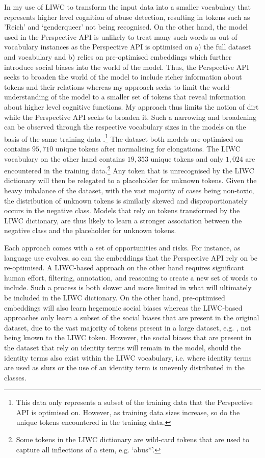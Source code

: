 In my use of LIWC to transform the input data into a smaller vocabulary that represents higher level cognition of abuse detection, resulting in tokens such as 'Reich' and `genderqueer' not being recognised.
On the other hand, the model used in the Perspective API is unlikely to treat many such words as out-of-vocabulary instances as the Perspective API is optimised on a) the full dataset and vocabulary and b) relies on pre-optimised embeddings which further introduce social biases into the world of the model.
Thus, the Perspective API seeks to broaden the world of the model to include richer information about tokens and their relations whereas my approach seeks to limit the world-understanding of the model to a smaller set of tokens that reveal information about higher level cognitive functions.
My approach thus limits the notion of dirt while the Perspective API seeks to broaden it.
Such a narrowing and broadening can be observed through the respective vocabulary sizes in the models on the basis of the same training data \citep{Wulczyn:2017}.\footnote{This data only represents a subset of the training data that the Perspective API is optimised on. However, as training data sizes increase, so do the unique tokens encountered in the training data.}
The dataset both models are optimised on contains $95,710$ unique tokens after normalising for elongations.
The LIWC vocabulary on the other hand contains $19,353$ unique tokens and only $1,024$ are encountered in the training data.\footnote{Some tokens in the LIWC dictionary are wild-card tokens that are used to capture all inflections of a stem, e.g. `abus*'.}
Any token that is unrecognised by the LIWC dictionary will then be relegated to a placeholder for unknown tokens.
Given the heavy imbalance of the dataset, with the vast majority of cases being non-toxic, the distribution of unknown tokens is similarly skewed and disproportionately occurs in the negative class.
Models that rely on tokens transformed by the LIWC dictionary, are thus likely to learn a stronger association between the negative class and the placeholder for unknown tokens.

Each approach comes with a set of opportunities and risks.
For instance, as language use evolves, so can the embeddings that the Perspective API rely on be re-optimised.
A LIWC-based approach on the other hand requires significant human effort, filtering, annotation, and reasoning to create a new set of words to include.
Such a process is both slower and more limited in what will ultimately be included in the LIWC dictionary.
On the other hand, pre-optimised embeddings will also learn hegemonic social biases \citep{Bender:2021} whereas the LIWC-based approaches only learn a subset of the social biases that are present in the original dataset, due to the vast majority of tokens present in a large dataset, e.g. \citep{Wulczyn:2017}, not being known to the LIWC token.
However, the social biases that are present in the dataset that rely on identity terms will remain in the model, should the identity terms also exist within the LIWC vocabulary, i.e. where identity terms are used as slurs or the use of an identity term is unevenly distributed in the classes.

